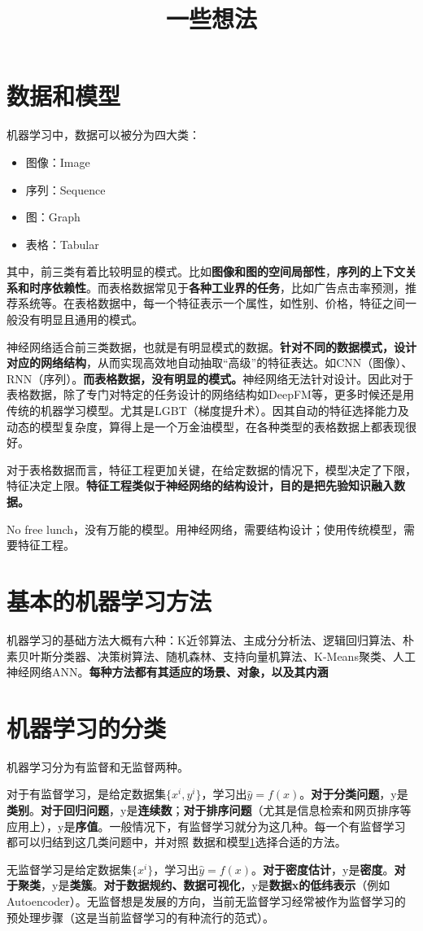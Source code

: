 \documentclass[12pt, letterpaper]{article}
\title{一些想法}
\begin{document}
\maketitle
\tableofcontents
\newpage

\section{数据和模型}\label{aaaa}
机器学习中，数据可以被分为四大类：
\begin{itemize}
\item 图像：Image
\item 序列：Sequence
\item 图：Graph
\item 表格：Tabular
\end{itemize}
其中，前三类有着比较明显的模式。比如\textbf{图像和图的空间局部性}，\textbf{序列的上下文关系和时序依赖性}。而表格数据常见于\textbf{各种工业界的任务}，比如广告点击率预测，推荐系统等。在表格数据中，每一个特征表示一个属性，如性别、价格，特征之间一般没有明显且通用的模式。

神经网络适合前三类数据，也就是有明显模式的数据。\textbf{针对不同的数据模式，设计对应的网络结构}，从而实现高效地自动抽取“高级”的特征表达。如CNN（图像）、RNN（序列）。\textbf{而表格数据，没有明显的模式。}神经网络无法针对设计。因此对于表格数据，除了专门对特定的任务设计的网络结构如DeepFM等，更多时候还是用传统的机器学习模型。尤其是LGBT（梯度提升术）。因其自动的特征选择能力及动态的模型复杂度，算得上是一个万金油模型，在各种类型的表格数据上都表现很好。

对于表格数据而言，特征工程更加关键，在给定数据的情况下，模型决定了下限，特征决定上限。\textbf{特征工程类似于神经网络的结构设计，目的是把先验知识融入数据。}

No free lunch，没有万能的模型。用神经网络，需要结构设计；使用传统模型，需要特征工程。

\section{基本的机器学习方法}
机器学习的基础方法大概有六种：K近邻算法、主成分分析法、逻辑回归算法、朴素贝叶斯分类器、决策树算法、随机森林、支持向量机算法、K-Means聚类、人工神经网络ANN。\textbf{每种方法都有其适应的场景、对象，以及其内涵}


\section{机器学习的分类}
机器学习分为有监督和无监督两种。

对于有监督学习，是给定数据集$\{x^i, y^i\}$，学习出$\hat{y}=f(x)$。\textbf{对于分类问题}，y是\textbf{类别}。\textbf{对于回归问题}，y是\textbf{连续数}；\textbf{对于排序问题}（尤其是信息检索和网页排序等应用上），y是\textbf{序值}。一般情况下，有监督学习就分为这几种。每一个有监督学习都可以归结到这几类问题中，并对照
数据和模型\ref{aaaa}选择合适的方法。


无监督学习是给定数据集$\{x^i\}$，学习出$\hat{y}=f(x)$。\textbf{对于密度估计}，y是\textbf{密度}。\textbf{对于聚类}，y是\textbf{类簇}。\textbf{对于数据规约、数据可视化}，y是\textbf{数据x的低纬表示}（例如Autoencoder）。无监督想是发展的方向，当前无监督学习经常被作为监督学习的预处理步骤（这是当前监督学习的有种流行的范式）。
\end{document}
